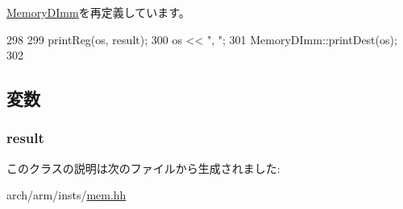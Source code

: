 \hyperlink{classArmISA_1_1MemoryDImm_adee5df6e5d6b0c498363aabda42431fa}{MemoryDImm}を再定義しています。


\begin{DoxyCode}
298     {
299         printReg(os, result);
300         os << ", ";
301         MemoryDImm::printDest(os);
302     }
\end{DoxyCode}


\subsection{変数}
\hypertarget{classArmISA_1_1MemoryExDImm_a43f8ecc8130e5285e0ae2134151d6d6a}{
\subsubsection[{result}]{ {\bf result}}}
\label{classArmISA_1_1MemoryExDImm_a43f8ecc8130e5285e0ae2134151d6d6a}


このクラスの説明は次のファイルから生成されました:\begin{DoxyCompactItemize}
\item 
arch/arm/insts/\hyperlink{arm_2insts_2mem_8hh}{mem.hh}\end{DoxyCompactItemize}
